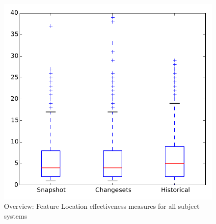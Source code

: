 
\begin{figure}
\centering
\includegraphics[height=0.4\textheight]{figures/flt/all_overview}
\caption{Overview: Feature Location effectiveness measures for all subject systems}
\label{fig:flt:all:overview}
\end{figure}
